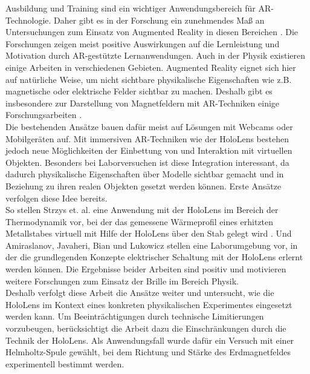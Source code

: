 Ausbildung und Training sind ein wichtiger Anwendungsbereich für AR-Technologie. Daher gibt es in der Forschung ein zunehmendes Maß an Untersuchungen zum Einsatz von Augmented Reality in diesen Bereichen \cite{Bacca14}. Die Forschungen zeigen meist positive Auswirkungen auf die Lernleistung und Motivation durch AR-gestützte Lernanwendungen. Auch in der Physik existieren einige Arbeiten in verschiedenen Gebieten. Augmented Reality eignet sich hier auf natürliche Weise, um nicht sichtbare physikalische Eigenschaften wie z.B. magnetische oder elektrische Felder sichtbar zu machen. Deshalb gibt es insbesondere zur Darstellung von Magnetfeldern mit AR-Techniken einige Forschungsarbeiten \cite{Buchau09, Mannuss11, Matsutomo13}.\\
\noindent\hspace*{5mm}
Die bestehenden Ansätze bauen dafür meist auf Lösungen mit Webcams oder Mobilgeräten auf. Mit immersiven AR-Techniken wie der HoloLens bestehen jedoch neue Möglichkeiten der Einbettung von und Interaktion mit virtuellen Objekten. Besonders bei Laborversuchen ist diese Integration interessant, da dadurch physikalische Eigenschaften über Modelle sichtbar gemacht und in Beziehung zu ihren realen Objekten gesetzt werden können. Erste Ansätze verfolgen diese Idee bereits.\\
\noindent\hspace*{5mm}
So stellen Strzys et. al. eine Anwendung mit der HoloLens im Bereich der Thermodynamik vor, bei der das gemessene Wärmeprofil eines erhitzten Metallstabes virtuell mit Hilfe der HoloLens über den Stab gelegt wird \cite{Strzys17}. Und Amiraslanov, Javaheri, Bian und Lukowicz stellen eine Laborumgebung vor, in der die grundlegenden Konzepte elektrischer Schaltung mit der HoloLens erlernt werden können. Die Ergebnisse beider Arbeiten sind positiv und motivieren weitere Forschungen zum Einsatz der Brille im Bereich Physik.\\

Deshalb verfolgt diese Arbeit die Ansätze weiter und untersucht, wie die HoloLens im Kontext eines konkreten physikalischen Experimentes eingesetzt werden kann. Um Beeinträchtigungen durch technische Limitierungen vorzubeugen, berücksichtigt die Arbeit dazu die Einschränkungen durch die Technik der HoloLens. Als Anwendungsfall wurde dafür ein Versuch mit einer Helmholtz-Spule gewählt, bei dem Richtung und Stärke des Erdmagnetfeldes experimentell bestimmt werden.

